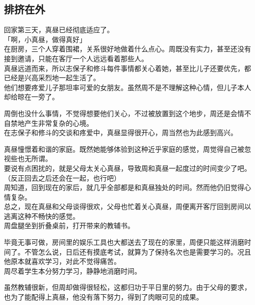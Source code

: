 \subsection{排挤在外}

回家第三天，真昼已经彻底适应了。\\

「啊，小真昼，做得真好」\\

在厨房，三个人穿着围裙，关系很好地做着什么点心。周既没有实力，甚至还没有接到邀请，只能在客厅一个人远远看着那些人。\\

真昼远道而来，所以志保子和修斗每件事情都关心着她，甚至比儿子还要优先，都已经是兴高采烈地一起生活了。\\

他们想要疼爱儿子那坦率可爱的女朋友。虽然周不是不理解这种心情，但儿子本人却给晾在一旁了。

周倒也没什么事情，不觉得想要他们关心，不过被放置到这个地步，周还是会情不自禁地产生非常复杂的心境。\\

在志保子和修斗的交谈和疼爱中，真昼显得很开心，周当然也为此感到高兴。

真昼憧憬着和谐的家庭。既然她能够体验到这种近乎家庭的感觉，周觉得自己被忽视些也无所谓。\\

要说有点困扰的，就是父母太关心真昼，导致周和真昼一起度过的时间变少了吧。\\

（反正回去之后还会在一起，也行吧）\\

周知道，回到现在的家后，就几乎全部都是和真昼独处的时间。然而他仍旧觉得心情复杂。\\

总之，现在真昼和父母谈得很欢，父母也忙着关心真昼，周便离开客厅回到房间以逃离这种不畅快的感觉。\\

周盘腿坐到折叠桌前，打开带来的教辅书。

毕竟无事可做，房间里的娱乐工具也大都送去了现在的家里，周便只能这样消磨时间了。不管怎么说，日后还有摸底考试，就算为了保持名次也是需要学习的。况且他原本就喜欢学习，对此不觉得痛苦。\\

周尽着学生本分努力学习，静静地消磨时间。

虽然教辅很新，但周却做得很轻松，这都归功于平日里的努力。由于父母的要求，也为了能配得上真昼，他没有落下努力，得到了肉眼可见的成果。\\

